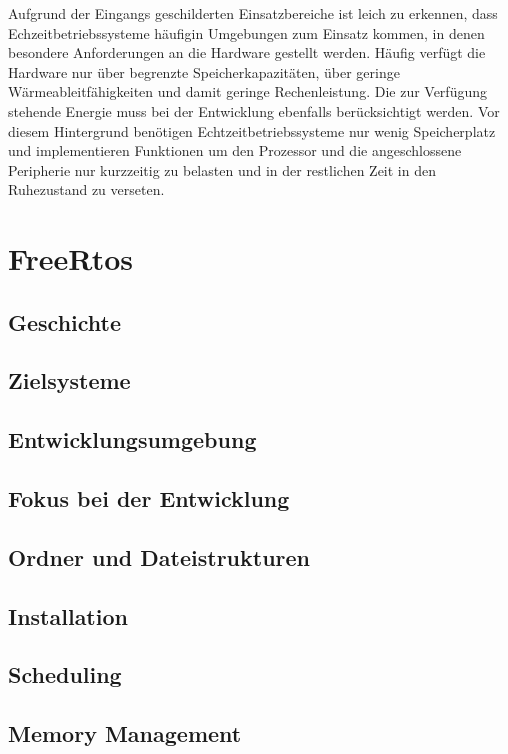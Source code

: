 \documentclass[ngerman]{seminarvorlage}
\begin{document}
Aufgrund der Eingangs geschilderten Einsatzbereiche ist leich zu erkennen, dass Echzeitbetriebssysteme häufigin Umgebungen zum Einsatz kommen, in denen besondere Anforderungen an die Hardware gestellt werden. Häufig verfügt die Hardware nur über begrenzte Speicherkapazitäten, über geringe Wärmeableitfähigkeiten und damit geringe Rechenleistung. Die zur Verfügung stehende Energie muss bei der Entwicklung ebenfalls berücksichtigt werden. 
Vor diesem Hintergrund benötigen Echtzeitbetriebssysteme nur wenig Speicherplatz und implementieren Funktionen um den Prozessor und die angeschlossene Peripherie nur kurzzeitig zu belasten und in der restlichen Zeit in den Ruhezustand zu verseten.

\section{FreeRtos} 
\subsection{Geschichte}
\subsection{Zielsysteme}
\subsection{Entwicklungsumgebung}

\subsection{Fokus bei der Entwicklung}
\subsection{Ordner und Dateistrukturen} 
\subsection{Installation}
\subsection{Scheduling}
\subsection{Memory Management}
\end{document}
